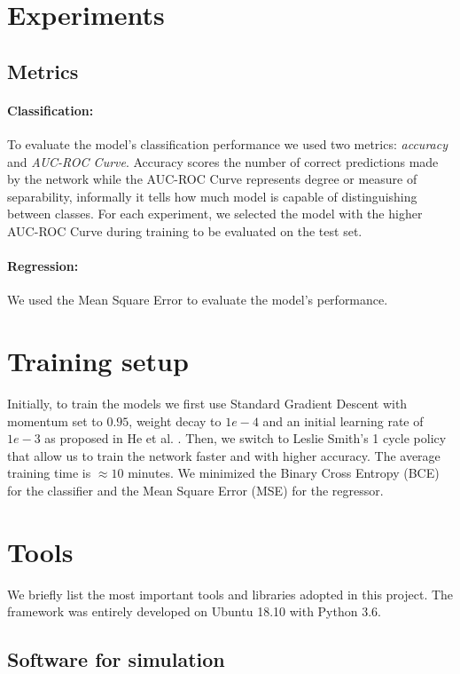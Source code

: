 \documentclass[../document.tex]{subfiles}
\begin{document}
\section{Experiments}

\subsection{Metrics}
\paragraph{Classification:} To evaluate the model's classification performance we used two metrics: \emph{accuracy} and \emph{AUC-ROC Curve}. Accuracy scores the number of correct predictions made by the network while the AUC-ROC Curve represents degree or measure of separability, informally it tells how much model is capable of distinguishing between classes. For each experiment, we selected the model with the higher AUC-ROC Curve during training to be evaluated on the test set.

\paragraph{Regression:} We used the Mean Square Error to evaluate the model's performance.

\section{Training setup}
Initially, to train the models we first use Standard Gradient Descent with momentum set to $0.95$, weight decay to $1e-4$ and an initial learning rate of $1e-3$ as proposed in He et al. \cite{he2015deep}. Then, we switch to Leslie Smith's 1 cycle policy \cite{1cycle} that allow us to train the network faster and with higher accuracy. The average training time is $\approx 10$ minutes. We minimized the Binary Cross Entropy (BCE) for the classifier and the  Mean Square Error (MSE) for the regressor.

\section{Tools}
We briefly list the most important tools and libraries adopted in this project. The framework was entirely developed on Ubuntu 18.10 with Python 3.6.
\subsection{Software for simulation}
\end{document}
